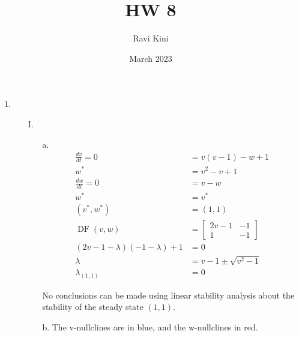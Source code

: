 \documentclass{article}
\title{HW 8}
\author{Ravi Kini}
\date{March 2023}
\begin{document}
	\maketitle
	\begin{enumerate}
		\item
		\begin{enumerate}
			\item [I.]
			\begin{enumerate}
				\item [a.]
				\begin{equation}
					\begin{split}
						\frac{dv}{dt} = 0 & = v(v - 1) - w + 1 \\
						w^* & = v^2 - v + 1 \\
						\frac{dw}{dt} = 0 & = v - w \\
						w^* & = v^* \\
						(v^*, w^*) & = (1,1) \\
						\operatorname{DF}(v,w) & = \begin{bmatrix} 2v - 1 & -1 \\ 1 & -1\end{bmatrix} \\
						(2v - 1 - \lambda)(-1-\lambda) + 1 & = 0 \\
						\lambda & = v - 1 \pm \sqrt{v^2 - 1} \\
						\lambda_{(1,1)} & = 0
					\end{split}
				\end{equation}
				
				No conclusions can be made using linear stability analysis about the stability of the steady state $(1,1)$.
				\item [b.]
				The v-nullclines are in blue, and the w-nullclines in red.
		
		

\end{enumerate}
\end{enumerate}
\end{enumerate}
\end{document}
